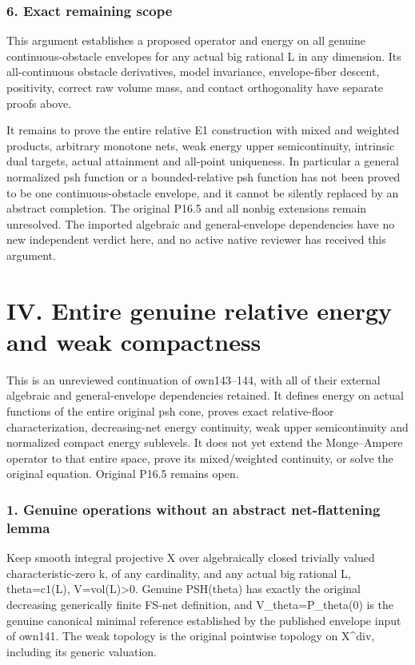 \documentclass[
  10pt,
]{article}
\begin{document}
\subsubsection{6. Exact remaining scope}\label{exact-remaining-scope}

This argument establishes a proposed operator and energy on all genuine
continuous-obstacle envelopes for any actual big rational L in any
dimension. Its all-continuous obstacle derivatives, model invariance,
envelope-fiber descent, positivity, correct raw volume mass, and contact
orthogonality have separate proofs above.

It remains to prove the entire relative E1 construction with mixed and
weighted products, arbitrary monotone nets, weak energy upper
semicontinuity, intrinsic dual targets, actual attainment and all-point
uniqueness. In particular a general normalized psh function or a
bounded-relative psh function has not been proved to be one
continuous-obstacle envelope, and it cannot be silently replaced by an
abstract completion. The original P16.5 and all nonbig extensions remain
unresolved. The imported algebraic and general-envelope dependencies
have no new independent verdict here, and no active native reviewer has
received this argument.

\section{IV. Entire genuine relative energy and weak
compactness}\label{iv.-entire-genuine-relative-energy-and-weak-compactness}

This is an unreviewed continuation of own143--144, with all of their
external algebraic and general-envelope dependencies retained. It
defines energy on actual functions of the entire original psh cone,
proves exact relative-floor characterization, decreasing-net energy
continuity, weak upper semicontinuity and normalized compact energy
sublevels. It does not yet extend the Monge--Ampere operator to that
entire space, prove its mixed/weighted continuity, or solve the original
equation. Original P16.5 remains open.

\subsubsection{1. Genuine operations without an abstract net-flattening
lemma}\label{genuine-operations-without-an-abstract-net-flattening-lemma}

Keep smooth integral projective X over algebraically closed trivially
valued characteristic-zero k, of any cardinality, and any actual big
rational L, theta=c1(L), V=vol(L)\textgreater0. Genuine PSH(theta) has
exactly the original decreasing generically finite FS-net definition,
and V\_theta=P\_theta(0) is the genuine canonical minimal reference
established by the published envelope input of own141. The weak topology
is the original pointwise topology on X\^{}div, including its generic
valuation.
\end{document}
